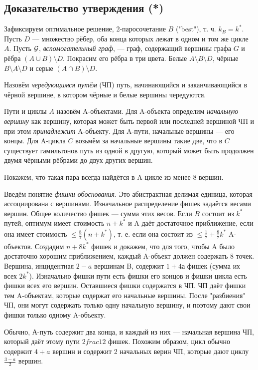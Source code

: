 \begin{proofstar}
\subsection{Доказательство утверждения (*)}
Зафиксируем оптимальное решение, 2-паросочетание $B$ ("best"), т. ч. $k_B = k^*$. Пусть $D$ --- множество рёбер, оба конца которых лежат в одном и том же цикле $A$. Пусть $\mathcal{G}$, \textit{вспомогательный граф}, --- граф, содержащий вершины графа $G$ и рёбра $(A \cup B) \setminus D$. Покрасим его рёбра в три цвета.
Белые $A \setminus B \setminus D$, чёрные $B \setminus A \setminus D$ и серые $(A \cap B) \setminus D$. 

Назовём \textit{чередующимся путём} (ЧП) путь, начинающийся и заканчивающийся в чёрной вершине, в котором чёрные и белые вершины чередуются.

Пути и циклы $A$ назовём A-объектами. Для A-объекта определим \textit{начальную вершину} как вершину, которая может быть первой или последней вершиной ЧП и при этом \textit{принадлежит} A-объекту. Для A-пути, начальные вершины --- его концы. Для A-цикла $C$ возьмём за начальные вершины такие две, что в $C$ существует гамильтонов путь из одной в другую, который может быть продолжен двумя чёрными рёбрами до двух других вершин. 

Покажем, что такая пара всегда найдётся в A-цикле из менее 8 вершин.

Введём понятие \textit{фишки обоснования}. Это абистрактная делимая единица, которая ассоциирована с вершинами. Изначальное распределение фишек задаётся весами вершин. Общее количество фишек --- сумма этих весов.
Если $B$ состоит из $k^*$ путей, оптимум имеет стоимость $n+k^*$ и A даёт достаточное приближение, если она имеет стоимость $\le \frac{8}{7}(n+k^*)$, т. е. если она состоит из $\le \frac{1}{7} + \frac{8}{7}k^*$ A-объектов. Создадим $n+8k^*$ фишек и докажем, что для того, чтобы A было достаточно хорошим приближением, каждый A-объект должен содержать 8 точек.
Вершина, инцидентная $2-a$ вершинам B, содержит $1+4а$ фишек (сумма их всех $2k^*$). Изначально фишки пути есть фишки его концов и фишки цикла есть фишки всех его вершин. Оставшиеся фишки содержатся в ЧП. ЧП даёт фишки тем A-объектам, которые содержат его начальные вершины. После "разбиения" ЧП, они могут содержать только одну начальную вершину, и поэтому дают свои фишки только одному A-объекту.

Обычно, А-путь содержит два конца, и каждый из них --- начальная вершина ЧП, который даёт этому пути $2
frac{1}{2}$ фишек. Похожим образом, цикл обычно содержит $4+a$ вершин и содержит 2 начальных верин ЧП, которые дают циклу $\frac{3-a}{2}$ вершин. 


\end{proofstar}

